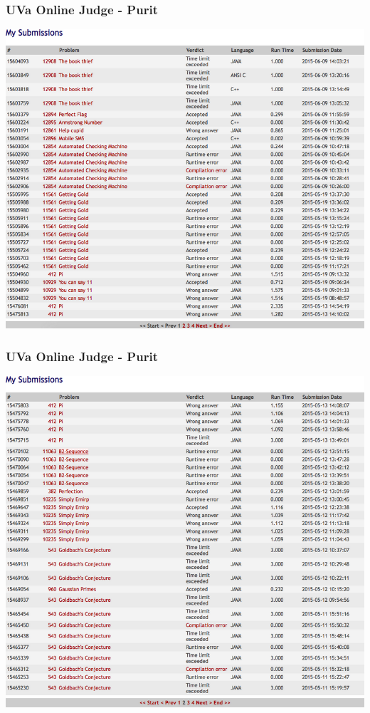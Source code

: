 \documentclass{beamer}
\begin{document}
			\begin{frame}
				\frametitle{UVa Online Judge - Purit}
				\begin{center}
					\includegraphics[scale=0.30]{Submission3-1} 
				\end{center}
			\end{frame}

			\begin{frame}
				\frametitle{UVa Online Judge - Purit}
				\begin{center}
					\includegraphics[scale=0.27]{Submission3-2} 
				\end{center}
			\end{frame}
\end{document}
